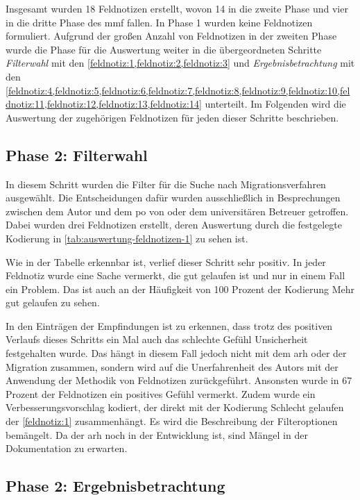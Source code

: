 Insgesamt wurden 18 Feldnotizen erstellt, wovon 14 in die zweite Phase und vier in die dritte Phase des \gls{mmf} fallen.
In Phase 1 wurden keine Feldnotizen formuliert.
Aufgrund der großen Anzahl von Feldnotizen in der zweiten Phase wurde die Phase für die Auswertung weiter in die übergeordneten Schritte \emph{Filterwahl} mit den \cref{feldnotiz:1,feldnotiz:2,feldnotiz:3} und \emph{Ergebnisbetrachtung} mit den \cref{feldnotiz:4,feldnotiz:5,feldnotiz:6,feldnotiz:7,feldnotiz:8,feldnotiz:9,feldnotiz:10,feldnotiz:11,feldnotiz:12,feldnotiz:13,feldnotiz:14} unterteilt.
Im Folgenden wird die Auswertung der zugehörigen Feldnotizen für jeden dieser Schritte beschrieben.

\subsection{Phase 2: Filterwahl}

In diesem Schritt wurden die Filter für die Suche nach Migrationsverfahren ausgewählt.
Die Entscheidungen dafür wurden ausschließlich in Besprechungen zwischen dem Autor und dem \gls{po} von \jf oder dem universitären Betreuer getroffen.
Dabei wurden drei Feldnotizen erstellt, deren Auswertung durch die festgelegte Kodierung in \cref{tab:auswertung-feldnotizen-1} zu sehen ist.



Wie in der Tabelle erkennbar ist, verlief dieser Schritt sehr positiv.
In jeder Feldnotiz wurde eine Sache vermerkt, die gut gelaufen ist und nur in einem Fall ein Problem.
Das ist auch an der Häufigkeit von 100 Prozent der Kodierung \glqq Mehr gut gelaufen\grqq{} zu sehen.

In den Einträgen der Empfindungen ist zu erkennen, dass trotz des positiven Verlaufs dieses Schritts ein Mal auch das schlechte Gefühl \glqq Unsicherheit\grqq{} festgehalten wurde.
Das hängt in diesem Fall jedoch nicht mit dem \gls{arh} oder der Migration zusammen, sondern wird auf die Unerfahrenheit des Autors mit der Anwendung der Methodik von Feldnotizen zurückgeführt.
Ansonsten wurde in 67 Prozent der Feldnotizen ein positives Gefühl vermerkt.
Zudem wurde ein Verbesserungsvorschlag kodiert, der direkt mit der Kodierung \glqq Schlecht gelaufen\grqq{} der \cref{feldnotiz:1} zusammenhängt.
Es wird die Beschreibung der Filteroptionen bemängelt.
Da der \gls{arh} noch in der Entwicklung ist, sind Mängel in der Dokumentation zu erwarten.

\subsection{Phase 2: Ergebnisbetrachtung}

